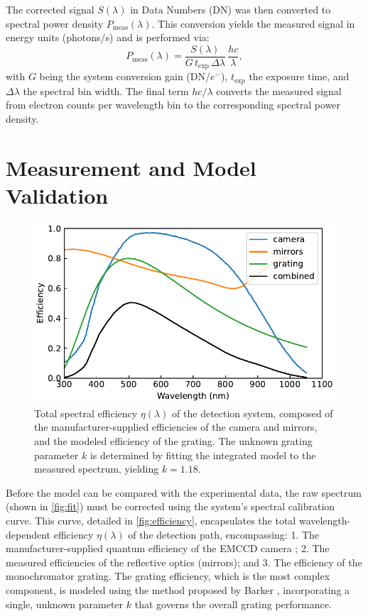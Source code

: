 \documentclass[
	a4paper,
]{scrarticle}
\begin{document}
The corrected signal $S(\lambda)$ in Data Numbers (DN) was then converted to spectral power density $P_{\text{meas}}(\lambda)$. This conversion yields the measured signal in energy units (photons/s) and is performed via:
\begin{equation}
  P_{\text{meas}}(\lambda)
  = \frac{S(\lambda)}{G\,t_{\text{exp}}\,\Delta\lambda}\,\frac{hc}{\lambda},
\end{equation}
with $G$ being the system conversion gain (DN/$e^-$), $t_{\text{exp}}$ the exposure time, and $\Delta\lambda$ the spectral bin width. The final term $hc /\lambda$ converts the measured signal from electron counts per wavelength bin to the corresponding spectral power density.

\clearpage
\section{Measurement and Model Validation}

\begin{figure}[h]
    \centering
    \includegraphics{../analysis/figures/combined.efficiency.pdf}
    \caption{Total spectral efficiency $\eta(\lambda)$ of the detection system, composed of the manufacturer-supplied efficiencies of the camera and mirrors, and the modeled efficiency of the grating. The unknown grating parameter $k$ is determined by fitting the integrated model to the measured spectrum, yielding $k=1.18$.}
    \label{fig:efficiency}
\end{figure}

Before the model can be compared with the experimental data, the raw spectrum (shown in \autoref{fig:fit}) must be corrected using the system's spectral calibration curve. This curve, detailed in \autoref{fig:efficiency}, encapsulates the total wavelength-dependent efficiency $\eta(\lambda)$ of the detection path, encompassing: 1. The manufacturer-supplied quantum efficiency of the EMCCD camera \cite{andorIXonEM897Manual}; 2. The measured efficiencies of the reflective optics (mirrors); and 3. The efficiency of the monochromator grating. The grating efficiency, which is the most complex component, is modeled using the method proposed by Barker \cite{barkerRippleCorrectionHighdispersion1984}, incorporating a single, unknown parameter $k$ that governs the overall grating performance.
\end{document}
